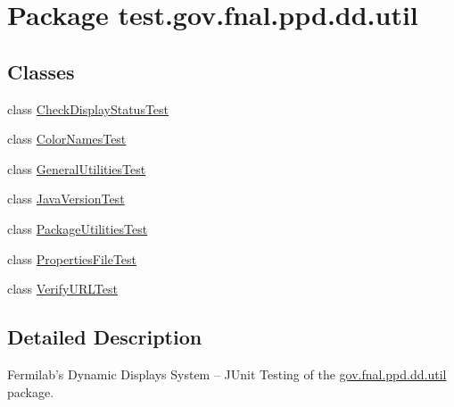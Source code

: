 \hypertarget{namespacetest_1_1gov_1_1fnal_1_1ppd_1_1dd_1_1util}{\section{Package test.\-gov.\-fnal.\-ppd.\-dd.\-util}
\label{namespacetest_1_1gov_1_1fnal_1_1ppd_1_1dd_1_1util}
}
\subsection*{Classes}
\begin{DoxyCompactItemize}
\item 
class \hyperlink{classtest_1_1gov_1_1fnal_1_1ppd_1_1dd_1_1util_1_1CheckDisplayStatusTest}{Check\-Display\-Status\-Test}
\item 
class \hyperlink{classtest_1_1gov_1_1fnal_1_1ppd_1_1dd_1_1util_1_1ColorNamesTest}{Color\-Names\-Test}
\item 
class \hyperlink{classtest_1_1gov_1_1fnal_1_1ppd_1_1dd_1_1util_1_1GeneralUtilitiesTest}{General\-Utilities\-Test}
\item 
class \hyperlink{classtest_1_1gov_1_1fnal_1_1ppd_1_1dd_1_1util_1_1JavaVersionTest}{Java\-Version\-Test}
\item 
class \hyperlink{classtest_1_1gov_1_1fnal_1_1ppd_1_1dd_1_1util_1_1PackageUtilitiesTest}{Package\-Utilities\-Test}
\item 
class \hyperlink{classtest_1_1gov_1_1fnal_1_1ppd_1_1dd_1_1util_1_1PropertiesFileTest}{Properties\-File\-Test}
\item 
class \hyperlink{classtest_1_1gov_1_1fnal_1_1ppd_1_1dd_1_1util_1_1VerifyURLTest}{Verify\-U\-R\-L\-Test}
\end{DoxyCompactItemize}


\subsection{Detailed Description}
Fermilab's Dynamic Displays System -- J\-Unit Testing of the \hyperlink{namespacetest_1_1gov_1_1fnal_1_1ppd_1_1dd_1_1util}{gov.\-fnal.\-ppd.\-dd.\-util} package.